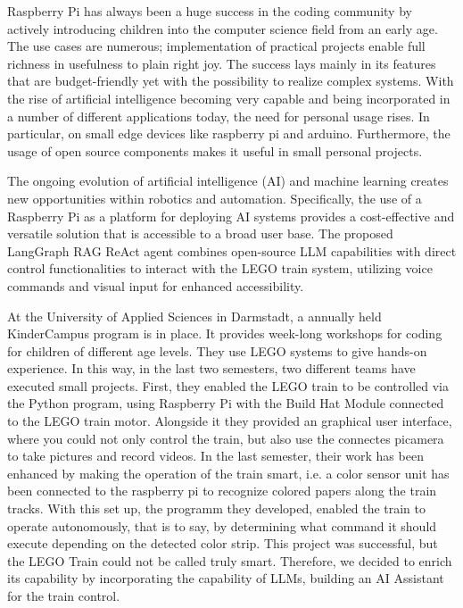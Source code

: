 Raspberry Pi has always been a huge success in the coding community by actively introducing children into the computer science field from an early age. The use cases are numerous; implementation of practical projects enable full richness in usefulness to plain right joy. The success lays mainly in its features that are budget-friendly yet with the possibility to realize complex systems. 
With the rise of artificial intelligence becoming very capable and being incorporated in a number of different applications today, the need for personal usage rises. In particular, on small edge devices like raspberry pi and arduino. Furthermore, the usage of open source components makes it useful in small personal projects.

The ongoing evolution of artificial intelligence (AI) and machine learning creates new opportunities within robotics and automation. Specifically, the use of a Raspberry Pi as a platform for deploying AI systems provides a cost-effective and versatile solution that is accessible to a broad user base. The proposed LangGraph RAG ReAct agent combines open-source LLM capabilities with direct control functionalities to interact with the LEGO train system, utilizing voice commands and visual input for enhanced accessibility. 



At the University of Applied Sciences in Darmstadt, a annually held KinderCampus program is in place. It provides week-long workshops for coding for children of different age levels. They use LEGO systems to give hands-on experience. In this way, in the last two semesters, two different teams have executed small projects. First, they enabled the LEGO train to be controlled via the Python program, using Raspberry Pi with the Build Hat Module connected to the LEGO train motor. Alongside it they provided an graphical user interface, where you could not only control the train, but also use the connectes picamera to take pictures and record videos. In the last semester, their work has been enhanced by making the operation of the train smart, i.e. a color sensor unit has been connected to the raspberry pi to recognize colored papers along the train tracks. With this set up, the programm they developed, enabled the train to operate autonomously, that is to say, by determining what command it should execute depending on the detected color strip. This project was successful, but the LEGO Train could not be called truly smart. Therefore, we decided to enrich its capability by incorporating the capability of LLMs, building an AI Assistant for the train control.

